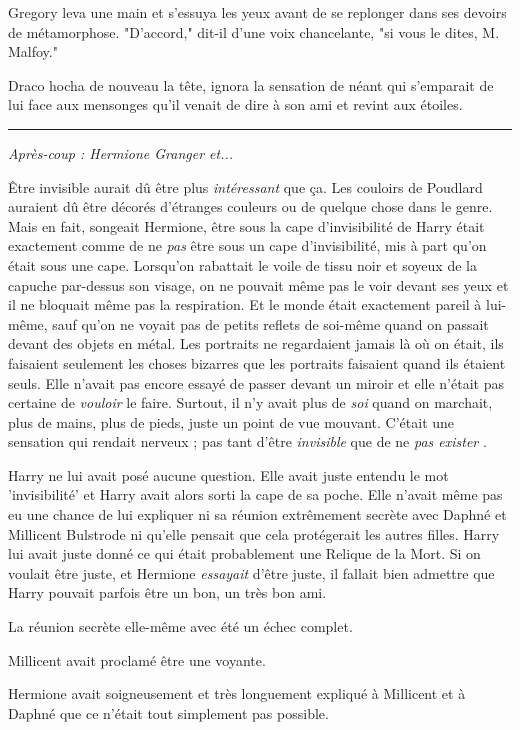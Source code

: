 Gregory leva une main et s'essuya les yeux avant de se replonger dans ses devoirs de métamorphose. "D'accord," dit-il d'une voix chancelante, "si vous le dites, M. Malfoy."

Draco hocha de nouveau la tête, ignora la sensation de néant qui s'emparait de lui face aux mensonges qu'il venait de dire à son ami et revint aux étoiles.
\par\noindent\rule{\textwidth}{0.4pt}
\emph{Après-coup : Hermione Granger et...} 

Être invisible aurait dû être plus \emph{intéressant}  que ça. Les couloirs de Poudlard auraient dû être décorés d'étranges couleurs ou de quelque chose dans le genre. Mais en fait, songeait Hermione, être sous la cape d'invisibilité de Harry était exactement comme de ne \emph{pas}  être sous un cape d'invisibilité, mis à part qu'on était sous une cape. Lorsqu'on rabattait le voile de tissu noir et soyeux de la capuche par-dessus son visage, on ne pouvait même pas le voir devant ses yeux et il ne bloquait même pas la respiration. Et le monde était exactement pareil à lui-même, sauf qu'on ne voyait pas de petits reflets de soi-même quand on passait devant des objets en métal. Les portraits ne regardaient jamais là où on était, ils faisaient seulement les choses bizarres que les portraits faisaient quand ils étaient seuls. Elle n'avait pas encore essayé de passer devant un miroir et elle n'était pas certaine de \emph{vouloir}  le faire. Surtout, il n'y avait plus de \emph{soi}  quand on marchait, plus de mains, plus de pieds, juste un point de vue mouvant. C'était une sensation qui rendait nerveux ; pas tant d'être \emph{invisible}  que de ne \emph{pas exister} .

Harry ne lui avait posé aucune question. Elle avait juste entendu le mot 'invisibilité' et Harry avait alors sorti la cape de sa poche. Elle n'avait même pas eu une chance de lui expliquer ni sa réunion extrêmement secrète avec Daphné et Millicent Bulstrode ni qu'elle pensait que cela protégerait les autres filles. Harry lui avait juste donné ce qui était probablement une Relique de la Mort. Si on voulait être juste, et Hermione \emph{essayait}  d'être juste, il fallait bien admettre que Harry pouvait parfois être un bon, un très bon ami.

La réunion secrète elle-même avec été un échec complet.

Millicent avait proclamé être une voyante.

Hermione avait soigneusement et très longuement expliqué à Millicent et à Daphné que ce n'était tout simplement pas possible.

